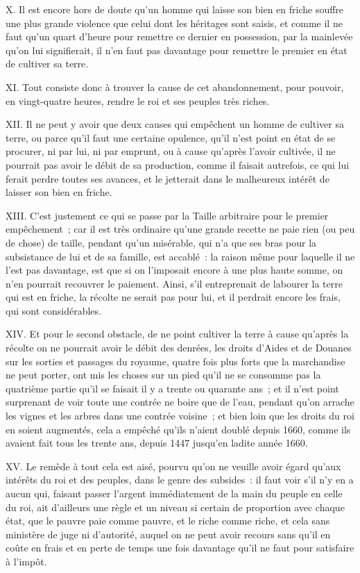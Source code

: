 \documentclass[french,twoside]{book} %
\begin{document}
X. Il est encore hors de doute qu’un homme qui laisse son bien en friche souffre une plus grande violence que celui dont les héritages sont saisis, et comme il ne faut qu’un quart d’heure pour remettre ce dernier en possession, par la mainlevée qu’on lui signifierait, il n’en faut pas davantage pour remettre le premier en état de cultiver sa terre.\par
XI. Tout consiste donc à trouver la cause de cet abandonnement, pour pouvoir, en vingt-quatre heures, rendre le roi et ses peuples très riches.\par
XII. Il ne peut y avoir que deux causes qui empêchent un homme de cultiver sa terre, ou parce qu’il faut une certaine opulence, qu’il n’est point en état de se procurer, ni par lui, ni par emprunt, ou à cause qu’après l’avoir cultivée, il ne pourrait pas avoir le débit de sa production, comme il faisait autrefois, ce qui lui ferait perdre toutes ses avances, et le jetterait dans le malheureux intérêt de laisser son bien en friche.\par
XIII. C’est justement ce qui se passe par la Taille arbitraire pour le premier empêchement ; car il est très ordinaire qu’une grande recette ne paie rien (ou peu de chose) de taille, pendant qu’un misérable, qui n’a que ses bras pour la subsistance de lui et de sa famille, est accablé : la raison même pour laquelle il ne l’est pas davantage, est que si on l’imposait encore à une plus haute somme, on n’en pourrait recouvrer le paiement. Ainsi, s’il entreprenait de labourer la terre qui est en friche, la récolte ne serait pas pour lui, et il perdrait encore les frais, qui sont considérables.\par
XIV. Et pour le second obstacle, de ne point cultiver la terre à cause qu’après la récolte on ne pourrait avoir le débit des denrées, les droits d’Aides et de Douanes sur les sorties et passages du royaume, quatre fois plus forts que la marchandise ne peut porter, ont mis les choses sur un pied qu’il ne se consomme pas la quatrième partie qu’il se faisait il y a trente ou quarante ans ; et il n’est point surprenant de voir toute une contrée ne boire que de l’eau, pendant qu’on arrache les vignes et les arbres dans une contrée voisine ; et bien loin que les droits du roi en soient augmentés, cela a empêché qu’ils n’aient doublé depuis 1660, comme ils avaient fait tous les trente ans, depuis 1447 jusqu’en ladite année 1660.\par
XV. Le remède à tout cela est aisé, pourvu qu’on ne veuille avoir égard qu’aux intérêts du roi et des peuples, dans le genre des subsides : il faut voir s’il n’y en a aucun qui, faisant passer l’argent immédiatement de la main du peuple en celle du roi, ait d’ailleurs une règle et un niveau si certain de proportion avec chaque état, que le pauvre paie comme pauvre, et le riche comme riche, et cela sans ministère de juge ni d’autorité, auquel on ne peut avoir recours sans qu’il en coûte en frais et en perte de temps une fois davantage qu’il ne faut pour satisfaire à l’impôt.\par
\end{document}
